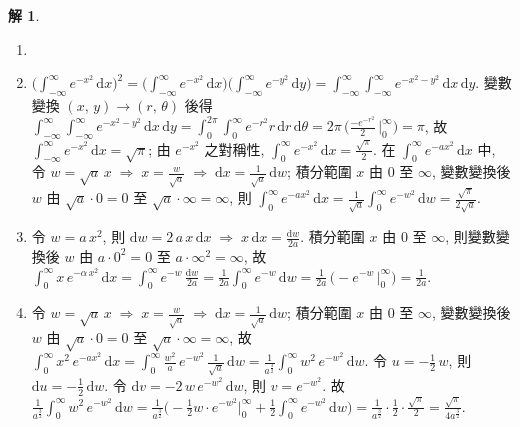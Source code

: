 \documentclass[12pt]{extarticle}
\newcommand{\ds}{\displaystyle}
\newcommand{\ie}{\;\Longrightarrow\;}
\theoremstyle{definition}
\newtheorem*{sol}{解}
\begin{document}
\begin{sol}
  \begin{enumerate}\setlength{\itemsep}{0pt}
    \item[]
    \item $\ds\bigg(\int_{-\infty}^\infty\!e^{-x^2}\,\text{d}x\bigg)^2 = \bigg(\int_{-\infty}^\infty\!e^{-x^2}\,\text{d}x\bigg)\bigg(\int_{-\infty}^\infty\!e^{-y^2}\,\text{d}y\bigg) = \int_{-\infty}^\infty\int_{-\infty}^\infty\!\!e^{-x^2 - y^2}\,\text{d}x\,\text{d}y$. 變數變換 $(x,\,y)\to(r,\,\theta)$ 後得 $\ds\int_{-\infty}^\infty\int_{-\infty}^\infty\!\!e^{-x^2 - y^2}\,\text{d}x\,\text{d}y = \int_0^{2\pi}\!\!\!\int_0^\infty\!\!e^{-r^2}r\,\text{d}r\,\text{d}\theta = 2\pi\,\bigg(\frac{-e^{-r^2}}{2}\,\bigg|_0^\infty\bigg) = \pi$, 故 $\ds\int_{-\infty}^\infty\!e^{-x^2}\,\text{d}x = \sqrt{\pi}$; 由 $e^{-x^2}$ 之對稱性, $\ds\int_0^\infty\!e^{-x^2}\,\text{d}x = \frac{\sqrt{\pi}}{2}$. 在 $\ds\int_0^\infty\!e^{-ax^2}\,\text{d}x$ 中, 令 $\ds w = \sqrt{a}\,x\ie x = \frac{w}{\sqrt{a}}\ie\mathrm{d}x = \frac{1}{\sqrt{a}}\,\mathrm{d}w$; 積分範圍 $x$ 由 $0$ 至 $\infty$, 變數變換後 $w$ 由 $\ds\sqrt{a}\cdot 0 = 0$ 至 $\ds\sqrt{a}\cdot\infty = \infty$, 則 $\ds\int_0^\infty\!e^{-ax^2}\,\text{d}x = \frac{1}{\sqrt{a}}\int_0^\infty\!e^{-w^2}\,\text{d}w = \frac{\sqrt{\pi}}{2\sqrt{a}}$.
    \item 令 $\ds w = a\,x^2$, 則 $\ds\mathrm{d}w = 2\,a\,x\,\mathrm{d}x \ie x\,\mathrm{d}x = \frac{\mathrm{d}w}{2a}$. 積分範圍 $x$ 由 $0$ 至 $\infty$, 則變數變換後 $w$ 由 $\ds a\cdot 0^2 = 0$ 至 $\ds a\cdot\infty^2 = \infty$, 故 $\ds\int_0^\infty x\,e^{-\alpha\,x^2}\,\mathrm{d}x = \int_0^\infty\!e^{-w}\,\frac{\mathrm{d}w}{2a} = \frac{1}{2a}\int_0^\infty\!e^{-w}\,\mathrm{d}w = \frac{1}{2a}\,\Big(-e^{-w}\,\Big|_0^\infty\Big) = \frac{1}{2a}$. 
    \item 令 $\ds w = \sqrt{a}\,x\ie x = \frac{w}{\sqrt{a}}\ie\mathrm{d}x = \frac{1}{\sqrt{a}}\,\mathrm{d}w$; 積分範圍 $x$ 由 $0$ 至 $\infty$, 變數變換後 $w$ 由 $\ds\sqrt{a}\cdot 0 = 0$ 至 $\ds\sqrt{a}\cdot\infty = \infty$, 故 $\ds\int_0^\infty x^2\,e^{-a x^2}\,\mathrm{d}x = \int_0^\infty\frac{w^2}{a}\,e^{-w^2}\,\frac{1}{\sqrt{a}}\,\mathrm{d}w = \frac{1}{a^\frac{3}{2}}\int_0^\infty w^2\,e^{-w^2}\,\mathrm{d}w$. 令 $\ds u = -\frac{1}{2}\,w$, 則 $\ds\mathrm{d}u = -\frac{1}{2}\,\mathrm{d}w$. 令 $\ds\mathrm{d}v = -2\,w\,e^{-w^2}\,\mathrm{d}w$, 則 $\ds v = e^{-w^2}$. 故 $\ds\frac{1}{a^\frac{3}{2}}\int_0^\infty w^2\,e^{-w^2}\,\mathrm{d}w = \frac{1}{a^\frac{3}{2}}\bigg(-\frac{1}{2}w\cdot e^{-w^2}\Big|_0^\infty + \frac{1}{2}\int_0^\infty e^{-w^2}\,\mathrm{d}w\bigg) = \frac{1}{a^\frac{3}{2}}\cdot\frac{1}{2}\cdot\frac{\sqrt{\pi}}{2} = \frac{\sqrt{\pi}}{4a^\frac{3}{2}}$.
  \end{enumerate}
\end{sol}
\end{document}
